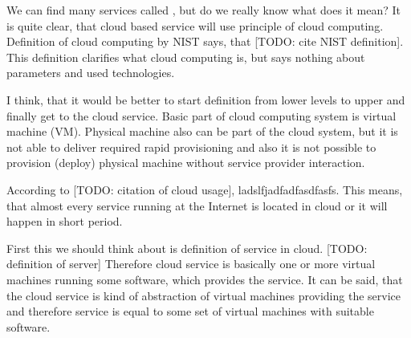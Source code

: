 
We can find many services called , but do we really know what does it mean? It is quite clear, that cloud based service will use principle of cloud computing. Definition of cloud computing by \Ac{NIST} says, that  [TODO: cite NIST definition]. This definition clarifies what cloud computing is, but says nothing about parameters and used technologies.

I think, that it would be better to start definition from lower levels to upper and finally get to the cloud service. Basic part of cloud computing system is virtual machine (\Ac{VM}). Physical machine also can be part of the cloud system, but it is not able to deliver required rapid provisioning and also it is not possible to provision (deploy) physical machine without service provider interaction.




According to [TODO: citation of cloud usage], ladslfjadfadfasdfasfs. This means, that almost every service running at the Internet is located in cloud or it will happen in short period. 

First this we should think about is definition of service in cloud. [TODO: definition of server] Therefore cloud service is basically one or more virtual machines running some software, which provides the service. It can be said, that the cloud service is kind of abstraction of virtual machines providing the service and therefore service is equal to some set of virtual machines with suitable software.


